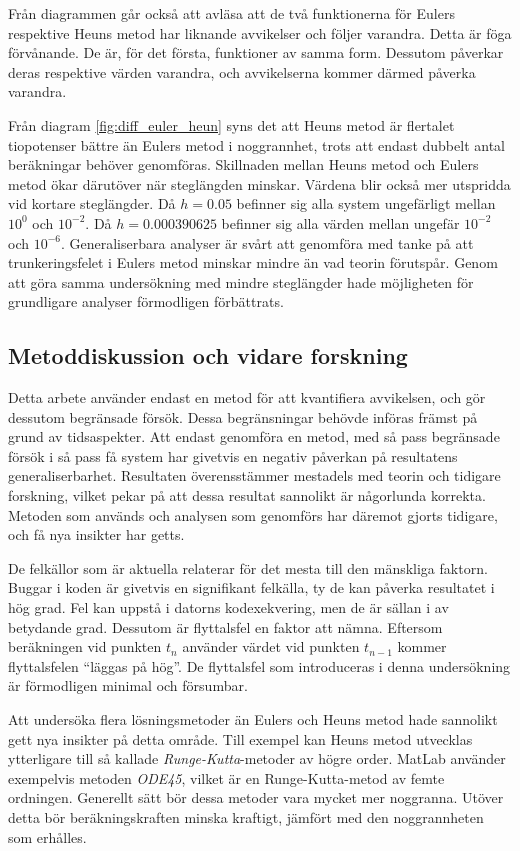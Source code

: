 Från diagrammen går också att avläsa att de två funktionerna för Eulers respektive Heuns metod har liknande avvikelser och följer varandra. Detta är föga förvånande. De är, för det första, funktioner av samma form. Dessutom påverkar deras respektive värden varandra, och avvikelserna kommer därmed påverka varandra.

Från diagram \ref{fig:diff_euler_heun} syns det att Heuns metod är flertalet tiopotenser bättre än Eulers metod i noggrannhet, trots att endast dubbelt antal beräkningar behöver genomföras. Skillnaden mellan Heuns metod och Eulers metod ökar därutöver när steglängden minskar. Värdena blir också mer utspridda vid kortare steglängder. Då \(h=0.05\) befinner sig alla system ungefärligt mellan \(10^0\) och \(10^{-2}\). Då \(h=0.000390625\) befinner sig alla värden mellan ungefär \(10^{-2}\) och \(10^{-6}\). Generaliserbara analyser är svårt att genomföra med tanke på att trunkeringsfelet i Eulers metod minskar mindre än vad teorin förutspår. Genom att göra samma undersökning med mindre steglängder hade möjligheten för grundligare analyser förmodligen förbättrats.

\subsection{Metoddiskussion och vidare forskning}
Detta arbete använder endast en metod för att kvantifiera avvikelsen, och gör dessutom begränsade försök. Dessa begränsningar behövde införas främst på grund av tidsaspekter. Att endast genomföra en metod, med så pass begränsade försök i så pass få system har givetvis en negativ påverkan på resultatens generaliserbarhet. Resultaten överensstämmer mestadels med teorin och tidigare forskning, vilket pekar på att dessa resultat sannolikt är någorlunda korrekta. Metoden som används och analysen som genomförs har däremot gjorts tidigare, och få nya insikter har getts.

De felkällor som är aktuella relaterar för det mesta till den mänskliga faktorn. Buggar i koden är givetvis en signifikant felkälla, ty de kan påverka resultatet i hög grad. Fel kan uppstå i datorns kodexekvering, men de är sällan i av betydande grad. Dessutom är flyttalsfel en faktor att nämna. Eftersom beräkningen vid punkten \(t_n\) använder värdet vid punkten \(t_{n-1}\) kommer flyttalsfelen ``läggas på hög''. De flyttalsfel som introduceras i denna undersökning är förmodligen minimal och försumbar.

Att undersöka flera lösningsmetoder än Eulers och Heuns metod hade sannolikt gett nya insikter på detta område. Till exempel kan Heuns metod utvecklas ytterligare till så kallade \emph{Runge-Kutta}-metoder av högre order. MatLab använder exempelvis metoden \emph{ODE45}, vilket är en Runge-Kutta-metod av femte ordningen. Generellt sätt bör dessa metoder vara mycket mer noggranna. Utöver detta bör beräkningskraften minska kraftigt, jämfört med den noggrannheten som erhålles.

